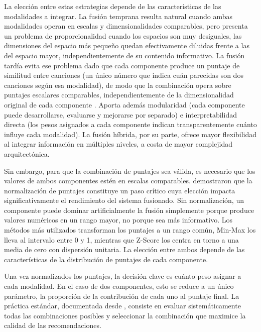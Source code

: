 La elección entre estas estrategias depende de las características de las modalidades a integrar. La fusión temprana resulta natural cuando ambas modalidades operan en escalas y dimensionalidades comparables, pero presenta un problema de proporcionalidad cuando los espacios son muy desiguales, las dimensiones del espacio más pequeño quedan efectivamente diluidas frente a las del espacio mayor, independientemente de su contenido informativo. La fusión tardía evita ese problema dado que cada componente produce un puntaje de similitud entre canciones (un único número que indica cuán parecidas son dos canciones según esa modalidad), de modo que la combinación opera sobre puntajes escalares comparables, independientemente de la dimensionalidad original de cada componente \parencite{vogt_1999_linear_fusion}. Aporta además modularidad (cada componente puede desarrollarse, evaluarse y mejorarse por separado) e interpretabilidad directa (los pesos asignados a cada componente indican transparentemente cuánto influye cada modalidad). La fusión híbrida, por su parte, ofrece mayor flexibilidad al integrar información en múltiples niveles, a costa de mayor complejidad arquitectónica.

Sin embargo, para que la combinación de puntajes sea válida, es necesario que los valores de ambos componentes estén en escalas comparables. \textcite{montague_2001_normalization} demostraron que la normalización de puntajes constituye un paso crítico cuya elección impacta significativamente el rendimiento del sistema fusionado. Sin normalización, un componente puede dominar artificialmente la fusión simplemente porque produce valores numéricos en un rango mayor, no porque sea más informativo. Los métodos más utilizados transforman los puntajes a un rango común, Min-Max los lleva al intervalo entre 0 y 1, mientras que Z-Score los centra en torno a una media de cero con dispersión unitaria. La elección entre ambos depende de las características de la distribución de puntajes de cada componente.

Una vez normalizados los puntajes, la decisión clave es cuánto peso asignar a cada modalidad. En el caso de dos componentes, esto se reduce a un único parámetro, la proporción de la contribución de cada uno al puntaje final. La práctica estándar, documentada desde \textcite{burke_2002_hybrid}, consiste en evaluar sistemáticamente todas las combinaciones posibles y seleccionar la combinación que maximice la calidad de las recomendaciones.

